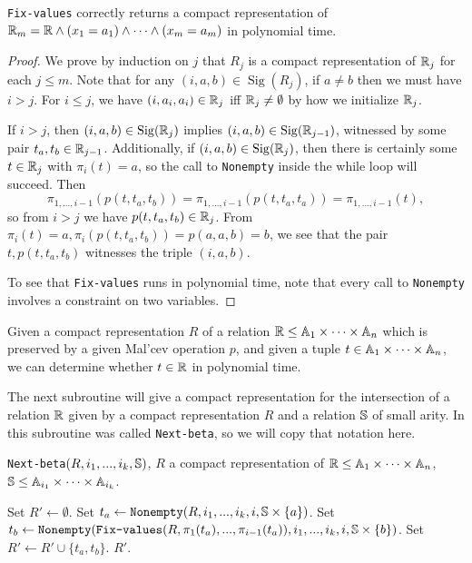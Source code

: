 \documentclass[letterpaper,11pt]{article}
\DeclareMathOperator{\Sig}{Sig}
\begin{document}
\begin{prop} \texttt{Fix-values} correctly returns a compact representation of $\mathbb{R}_m = \mathbb{R} \wedge (x_1 = a_1) \wedge \cdots \wedge (x_m = a_m)$ in polynomial time.
\end{prop}
\begin{proof} We prove by induction on $j$ that $R_j$ is a compact representation of $\mathbb{R}_j$ for each $j \le m$. Note that for any $(i,a,b) \in \Sig(R_j)$, if $a \ne b$ then we must have $i > j$. For $i \le j$, we have $(i,a_i,a_i) \in \mathbb{R}_j$ iff $\mathbb{R}_j \ne \emptyset$ by how we initialize $\mathbb{R}_j$.

If $i > j$, then $(i,a,b) \in \Sig(\RR_j)$ implies $(i,a,b) \in \Sig(\RR_{j-1})$, witnessed by some pair $t_a,t_b \in \mathbb{R}_{j-1}$. Additionally, if $(i,a,b) \in \Sig(\RR_j)$, then there is certainly some $t \in \mathbb{R}_j$ with $\pi_i(t) = a$, so the call to \texttt{Nonempty} inside the while loop will succeed. Then
\[
\pi_{1,...,i-1}(p(t,t_a,t_b)) = \pi_{1,...,i-1}(p(t,t_a,t_a)) = \pi_{1, ..., i-1}(t),
\]
so from $i > j$ we have $p(t,t_a,t_b) \in \mathbb{R}_j$. From $\pi_i(t) = a, \pi_i(p(t,t_a,t_b)) = p(a,a,b) = b$, we see that the pair $t,p(t,t_a,t_b)$ witnesses the triple $(i,a,b)$.

To see that \texttt{Fix-values} runs in polynomial time, note that every call to \texttt{Nonempty} involves a constraint on two variables.
\end{proof}

\begin{cor} Given a compact representation $R$ of a relation $\mathbb{R} \le \mathbb{A}_1 \times \cdots \times \mathbb{A}_n$ which is preserved by a given Mal'cev operation $p$, and given a tuple $t \in \mathbb{A}_1 \times \cdots \times \mathbb{A}_n$, we can determine whether $t \in \mathbb{R}$ in polynomial time.
\end{cor}

The next subroutine will give a compact representation for the intersection of a relation $\mathbb{R}$ given by a compact representation $R$ and a relation $\mathbb{S}$ of small arity. In \cite{bulatov-dalmau-malcev} this subroutine was called \texttt{Next-beta}, so we will copy that notation here.

\begin{algorithm}
\caption{\texttt{Next-beta}$(R, i_1, ..., i_k, \mathbb{S})$, $R$ a compact representation of $\mathbb{R} \le \mathbb{A}_1\times \cdots\times \mathbb{A}_n$, $\mathbb{S} \le \mathbb{A}_{i_1} \times \cdots \times \mathbb{A}_{i_k}$.}
\begin{algorithmic}[1]
\State Set $R' \gets \emptyset$.
\ForAll{$(i,a,b) \in \Sig(R)$}
\State Set $t_a \gets \texttt{Nonempty}(R,i_1, ..., i_k,i,\mathbb{S}\times \{a\})$.
\State Set $t_b \gets \texttt{Nonempty}(\texttt{Fix-values}(R, \pi_1(t_a), ..., \pi_{i-1}(t_a)), i_1, ..., i_k, i, \mathbb{S}\times \{b\})$.
\State Set $R' \gets R' \cup \{t_a,t_b\}$.
\EndIf
\EndIf
\EndFor
\State \Return $R'$.
\end{algorithmic}
\end{algorithm}
\end{document}
